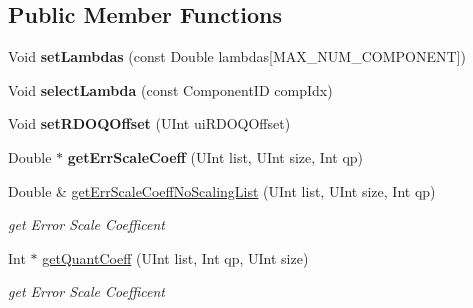 \subsection*{Public Member Functions}
\begin{DoxyCompactItemize}
\item 
\mbox{\label{class_t_com_tr_quant_a898d9717f837e48fb4223e7151d246fc}} 
Void {\bfseries set\+Lambdas} (const Double lambdas\mbox{[}M\+A\+X\+\_\+\+N\+U\+M\+\_\+\+C\+O\+M\+P\+O\+N\+E\+NT\mbox{]})
\item 
\mbox{\label{class_t_com_tr_quant_a6f51df86bbc753d3793f0d07631159a5}} 
Void {\bfseries select\+Lambda} (const Component\+ID comp\+Idx)
\item 
\mbox{\label{class_t_com_tr_quant_ab73d2daa14aac8ed69cc1a5b5601bb1a}} 
Void {\bfseries set\+R\+D\+O\+Q\+Offset} (U\+Int ui\+R\+D\+O\+Q\+Offset)
\item 
\mbox{\label{class_t_com_tr_quant_ae99b7040c2d48b94eb79e17290d0f20b}} 
Double $\ast$ {\bfseries get\+Err\+Scale\+Coeff} (U\+Int list, U\+Int size, Int qp)
\item 
\mbox{\label{class_t_com_tr_quant_a4b0086105317f9d1198af88a482dd253}} 
Double \& \hyperlink{class_t_com_tr_quant_a4b0086105317f9d1198af88a482dd253}{get\+Err\+Scale\+Coeff\+No\+Scaling\+List} (U\+Int list, U\+Int size, Int qp)
\begin{DoxyCompactList}\small\item\em get Error Scale Coefficent \end{DoxyCompactList}\item 
\mbox{\label{class_t_com_tr_quant_a1c0a4819a45dc37a69b2ea3cc63323db}} 
Int $\ast$ \hyperlink{class_t_com_tr_quant_a1c0a4819a45dc37a69b2ea3cc63323db}{get\+Quant\+Coeff} (U\+Int list, Int qp, U\+Int size)
\begin{DoxyCompactList}\small\item\em get Error Scale Coefficent \end{DoxyCompactList}\item 
\mbox{\label{class_t_com_tr_quant_ad7a885d13dbbad93bb0c41a885041732}} 

\end{DoxyCompactItemize}

